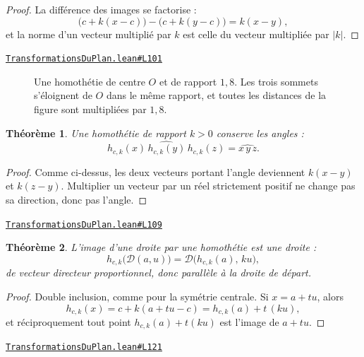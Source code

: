 \documentclass[11pt,a4paper]{article}
\theoremstyle{definition}
\theoremstyle{plain}
\newtheorem{theoreme}{Théorème}
\newcommand{\source}[2]{\par\smallskip\noindent\hfill{\footnotesize\href{#1}{\texttt{#2}}}\par\smallskip}
\begin{document}
\begin{proof}
La différence des images se factorise :
\[ \bigl(c + k(x - c)\bigr) - \bigl(c + k(y - c)\bigr) = k(x - y) , \]
et la norme d'un vecteur multiplié par $k$ est celle du vecteur multipliée par $|k|$.
\end{proof}
\source{https://github.com/Commutator-IO/learn-lean/blob/main/courses/01-college/03-transformations-du-plan/TransformationsDuPlan.lean\#L101}{TransformationsDuPlan.lean\#L101}

\begin{figure}[h]
\centering

\caption{Une homothétie de centre $O$ et de rapport $1{,}8$. Les trois sommets s'éloignent de $O$ dans le même rapport, et toutes les distances de la figure sont multipliées par $1{,}8$.}
\end{figure}

\begin{theoreme}
Une homothétie de rapport $k > 0$ conserve les angles :
\[ \widehat{h_{c,k}(x)\,h_{c,k}(y)\,h_{c,k}(z)} = \widehat{x\,y\,z} . \]
\end{theoreme}

\begin{proof}
Comme ci-dessus, les deux vecteurs portant l'angle deviennent $k(x - y)$ et $k(z - y)$.
Multiplier un vecteur par un réel strictement positif ne change pas sa direction, donc
pas l'angle.
\end{proof}
\source{https://github.com/Commutator-IO/learn-lean/blob/main/courses/01-college/03-transformations-du-plan/TransformationsDuPlan.lean\#L109}{TransformationsDuPlan.lean\#L109}

\begin{theoreme}
L'image d'une droite par une homothétie est une droite :
\[ h_{c,k}\bigl(\mathcal{D}(a, u)\bigr)
   = \mathcal{D}\bigl(h_{c,k}(a),\, ku\bigr) , \]
de vecteur directeur proportionnel, donc parallèle à la droite de départ.
\end{theoreme}

\begin{proof}
Double inclusion, comme pour la symétrie centrale. Si $x = a + tu$, alors
\[ h_{c,k}(x) = c + k(a + tu - c) = h_{c,k}(a) + t\,(ku) , \]
et réciproquement tout point $h_{c,k}(a) + t(ku)$ est l'image de $a + tu$.
\end{proof}
\source{https://github.com/Commutator-IO/learn-lean/blob/main/courses/01-college/03-transformations-du-plan/TransformationsDuPlan.lean\#L121}{TransformationsDuPlan.lean\#L121}
\end{document}
